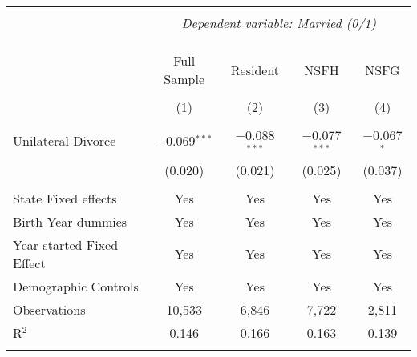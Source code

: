 
\begingroup 
\footnotesize 
\begin{tabular}{@{\extracolsep{5pt}}lcccc} 
\\[-1.8ex]\hline 
\hline \\[-1.8ex] 
 & \multicolumn{4}{c}{\textit{Dependent variable: Married (0/1)}} \\ 
\cline{2-5} 
\\[-1.8ex] &  &  &  & \\[-4.8ex] \\ 
 & Full Sample & Resident & NSFH & NSFG \\ 
\\[-1.8ex] & (1) & (2) & (3) & (4)\\ 
\hline \\[-1.8ex] 
 Unilateral Divorce & $-$0.069$^{***}$ & $-$0.088$^{***}$ & $-$0.077$^{***}$ & $-$0.067$^{*}$ \\ 
  & (0.020) & (0.021) & (0.025) & (0.037) \\ 
 \hline \\[-1.8ex] 
State Fixed effects & Yes & Yes & Yes & Yes \\ 
Birth Year dummies & Yes & Yes & Yes & Yes \\ 
Year started Fixed Effect & Yes & Yes & Yes & Yes \\ 
Demographic Controls & Yes & Yes & Yes & Yes \\ 
Observations & 10,533 & 6,846 & 7,722 & 2,811 \\ 
R$^{2}$ & 0.146 & 0.166 & 0.163 & 0.139 \\ 
\hline 
\hline \\[-1.8ex] 
\end{tabular} 
\endgroup 
